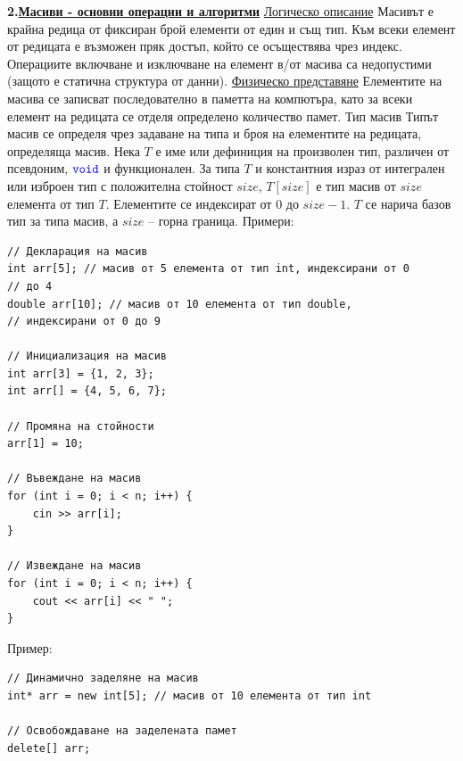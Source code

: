 \documentclass{article}
\begin{document}
\textbf{2.\underline{Масиви - основни операции и алгоритми}} \newline\newline
\underline{Логическо описание} \newline
Масивът е крайна редица от фиксиран брой елементи от един и същ тип. Към всеки елемент от редицата е възможен пряк достъп, който
се осъществява чрез индекс. Операциите включване и изключване на елемент в/от масива са недопустими (защото е статична структура от данни). \newline\newline
\underline{Физическо представяне} \newline
Елементите на масива се записват последователно в паметта на компютъра, като за всеки елемент на редицата се отделя определено
количество памет. \newline\newline
Тип масив \newline
Типът масив се определя чрез задаване на типа и броя на елементите на редицата, определяща масив. Нека $T$ е име или дефиниция на произволен тип, различен
от псевдоним, $\textcolor{blue}{\texttt{void}}$ и функционален. За типа $T$ и константния израз от интегрален или изброен тип с положителна стойност $size$, $T[size]$ е тип масив от $size$
елемента от тип $T$. Елементите се индексират от $0$ до $size - 1$. $T$ се нарича базов тип за типа масив, а $size$ – горна граница. \newline\newline
Примери:
\begin{lstlisting}[style=cpp]
// Декларация на масив
int arr[5]; // масив от 5 елемента от тип int, индексирани от 0
// до 4
double arr[10]; // масив от 10 елемента от тип double,
// индексирани от 0 до 9

// Инициализация на масив
int arr[3] = {1, 2, 3};
int arr[] = {4, 5, 6, 7};

// Промяна на стойности
arr[1] = 10;

// Въвеждане на масив
for (int i = 0; i < n; i++) {
    cin >> arr[i];
}

// Извеждане на масив
for (int i = 0; i < n; i++) {
    cout << arr[i] << " ";
}
\end{lstlisting}

Пример:
\begin{lstlisting}[style=cpp]
// Динамично заделяне на масив
int* arr = new int[5]; // масив от 10 елемента от тип int

// Освобождаване на заделената памет
delete[] arr;
\end{lstlisting}
\end{document}

